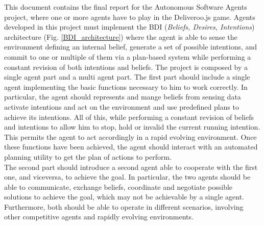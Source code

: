     This document contains the final report for the Autonomous Software Agents project, where one or more agents have to play in the Deliveroo.js game. Agents developed in this project must implement the BDI (\textit{Beliefs, Desires, Intentions}) architecture (Fig. \ref{BDI_architecture}) where the agent is able to sense the environment defining an internal belief, generate a set of possible intentions, and commit to one or multiple of them via a plan-based system while performing a constant revision of both intentions and beliefs.
    The project is composed by a single agent part and a multi agent part. The first part should include a single agent implementing the basic functions necessary to him to work correctly. In particular, the agent should represents and mange beliefs from sensing data activate intentions and act on the environment and use predefined plans to achieve its intentions. All of this, while performing a constant revision of beliefs and intentions to allow him to stop, hold or invalid the current running intention. This permits the agent to act accordingly in a rapid evolving environment. Once these functions have been achieved, the agent should interact with an automated planning utility to get the plan of actions to perform.
    \medskip\\
    The second part should introduce a second agent able to cooperate with the first one, and viceversa, to achieve the goal. In particular, the two agents should be able to communicate, exchange beliefs, coordinate and negotiate possible solutions to achieve the goal, which may not be achievable by a single agent.
    \medskip\\
    Furthermore, both should be able to operate in different scenarios, involving other competitive agents and rapidly evolving environments.

